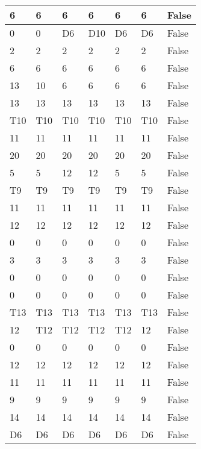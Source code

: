 \begin{longtable}[htbp]{| p{} | p{} | p{}| p{}| p{}| p{}| p{}|}
6 & 6 & 6 & 6 & 6 & 6 & False \\ \hline
0 & 0 & \multicolumn{1}{l|}{D6} & \multicolumn{1}{l|}{D10} & \multicolumn{1}{l|}{D6} & \multicolumn{1}{l|}{D6} & False \\ \hline
2 & 2 & 2 & 2 & 2 & 2 & False \\ \hline
6 & 6 & 6 & 6 & 6 & 6 & False \\ \hline
13 & 10 & 6 & 6 & 6 & 6 & False \\ \hline
13 & 13 & 13 & 13 & 13 & 13 & False \\ \hline
\multicolumn{1}{|l|}{T10} & \multicolumn{1}{l|}{T10} & \multicolumn{1}{l|}{T10} & \multicolumn{1}{l|}{T10} & \multicolumn{1}{l|}{T10} & \multicolumn{1}{l|}{T10} & False \\ \hline
11 & 11 & 11 & 11 & 11 & 11 & False \\ \hline
20 & 20 & 20 & 20 & 20 & 20 & False \\ \hline
5 & 5 & 12 & 12 & 5 & 5 & False \\ \hline
\multicolumn{1}{|l|}{T9} & \multicolumn{1}{l|}{T9} & \multicolumn{1}{l|}{T9} & \multicolumn{1}{l|}{T9} & \multicolumn{1}{l|}{T9} & \multicolumn{1}{l|}{T9} & False \\ \hline
11 & 11 & 11 & 11 & 11 & 11 & False \\ \hline
12 & 12 & 12 & 12 & 12 & 12 & False \\ \hline
0 & 0 & 0 & 0 & 0 & 0 & False \\ \hline
3 & 3 & 3 & 3 & 3 & 3 & False \\ \hline
0 & 0 & 0 & 0 & 0 & 0 & False \\ \hline
0 & 0 & 0 & 0 & 0 & 0 & False \\ \hline
\multicolumn{1}{|l|}{T13} & \multicolumn{1}{l|}{T13} & \multicolumn{1}{l|}{T13} & \multicolumn{1}{l|}{T13} & \multicolumn{1}{l|}{T13} & \multicolumn{1}{l|}{T13} & False \\ \hline
12 & \multicolumn{1}{l|}{T12} & \multicolumn{1}{l|}{T12} & \multicolumn{1}{l|}{T12} & \multicolumn{1}{l|}{T12} & 12 & False \\ \hline
0 & 0 & 0 & 0 & 0 & 0 & False \\ \hline
12 & 12 & 12 & 12 & 12 & 12 & False \\ \hline
11 & 11 & 11 & 11 & 11 & 11 & False \\ \hline
9 & 9 & 9 & 9 & 9 & 9 & False \\ \hline
14 & 14 & 14 & 14 & 14 & 14 & False \\ \hline
\multicolumn{1}{|l|}{D6} & \multicolumn{1}{l|}{D6} & \multicolumn{1}{l|}{D6} & \multicolumn{1}{l|}{D6} & \multicolumn{1}{l|}{D6} & \multicolumn{1}{l|}{D6} & False \\ \hline

\end{longtable}
